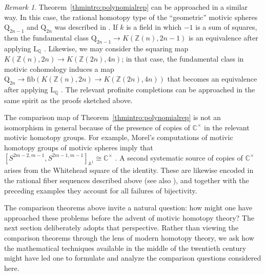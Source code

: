 \documentclass[11pt,leqno]{article}
\newcommand{\cplx}{{\mathbb C}}
\newcommand{\Q}{{\mathbb Q}}
\newcommand{\Z}{{\mathbb Z}}
\newcommand{\aone}{{\mathbb A}^1}
\renewcommand{\1}{{\rm 1\hspace*{-0.4ex}%
\rule{0.1ex}{1.52ex}\hspace*{0.2ex}}}
\renewcommand{\L}{{\mathrm L}}
\newcommand{\<}[1]{{\langle}#1 {\rangle}}
\newcommand{\fib}{\mathrm{fib}}
\newcounter{intro}
\theoremstyle{plain}
\theoremstyle{definition}
\theoremstyle{remark}
\newtheorem{rem}[theorem]{Remark}
\numberwithin{equation}{subsection}
\begin{document}
\begin{rem}
	\label{rem:polynomialreps}
	Theorem~\ref{thmintro:polynomialrep} can be approached in a similar way.  In this case, the rational homotopy type of the ``geometric'' motivic spheres $\mathrm{Q}_{2n-1}$ and $\mathrm{Q}_{2n}$ was described in \cite[\S 5.3]{AFHLocalization}.  If $k$ is a field in which $-1$ is a sum of squares, then the fundamental class $\mathrm{Q}_{2n-1} \to K(\Z(n),2n-1)$ is an equivalence after applying $\L_{\Q}$ \cite[Theorem 5.3.3]{AFHLocalization}.  Likewise, we may consider the squaring map $K(\Z(n),2n) \to K(\Z(2n),4n)$; in that case, the fundamental class in motivic cohomology induces a map $\mathrm{Q}_{2n} \to \fib(K(\Z(n),2n) \to K(\Z(2n),4n))$ that becomes an equivalence after applying $\L_{\Q}$ \cite[Theorem 5.3.11]{AFHLocalization}.  The relevant profinite completions can be approached in the same spirit as the proofs sketched above.  
	
	The comparison map of Theorem~\ref{thmintro:polynomialrep} is not an isomorphism in general because of the presence of copies of $\cplx^\times$ in the relevant motivic homotopy groups.  For example, Morel's computations of motivic homotopy groups of motivic spheres imply that $[S^{2m-2,m-1},S^{2m-1,m-1}]_{\aone} \cong \cplx^{\times}$ \cite{MField}.  A second systematic source of copies of $\cplx^\times$ arises from the Whitehead square of the identity. These are likewise encoded in the rational fiber sequences described above (see also \cite[Theorem~3]{AWW}), and together with the preceding examples they account for all failures of bijectivity.
\end{rem}

The comparison theorems above invite a natural question: how might one have approached these problems before the advent of motivic homotopy theory? The next section deliberately adopts that perspective. Rather than viewing the comparison theorems through the lens of modern homotopy theory, we ask how the mathematical techniques available in the middle of the twentieth century might have led one to formulate and analyze the comparison questions considered here.
\end{document}
